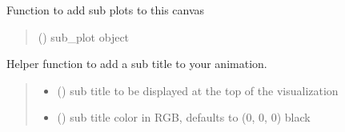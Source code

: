 \documentclass[letterpaper,10pt,english]{sphinxmanual}
\begin{document}
\begin{fulllineitems}
\begin{fulllineitems}
\label{\detokenize{index:sjvisualizer.Canvas.canvas.add_sub_plot}}
\pysigstartsignatures
{}
\pysigstopsignatures
\sphinxAtStartPar
Function to add sub plots to this canvas
\begin{quote}\begin{description}
\sphinxAtStartPar
{} () \textendash{} sub\_plot object

\end{description}\end{quote}

\end{fulllineitems}


\begin{fulllineitems}
\label{\detokenize{index:sjvisualizer.Canvas.canvas.add_sub_title}}
\pysigstartsignatures
{}
\pysigstopsignatures
\sphinxAtStartPar
Helper function to add a sub title to your animation.
\begin{quote}\begin{description}
\begin{itemize}
\item {} 
\sphinxAtStartPar
{} () \textendash{} sub title to be displayed at the top of the visualization

\item {} 
\sphinxAtStartPar
{} () \textendash{} sub title color in RGB, defaults to (0, 0, 0) black

\end{itemize}

\end{description}\end{quote}


\end{fulllineitems}
\end{fulllineitems}
\end{document}
